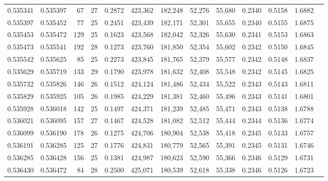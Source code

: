 \begin{tabular}{rrrrrrrrrrrrr}
0.535341 & 0.535397 &  67 &  27 &                                     0.2872 & 423,362 & 182,248 &  52,276 &  55,680 & 0.2340 & 0.5158 & 1.6882 \\
0.535397 & 0.535452 &  77 &  25 &                                     0.2451 & 423,439 & 182,171 &  52,301 &  55,655 & 0.2340 & 0.5155 & 1.6875 \\
0.535453 & 0.535472 & 129 &  25 &                                     0.1623 & 423,568 & 182,042 &  52,326 &  55,630 & 0.2341 & 0.5153 & 1.6863 \\
0.535473 & 0.535541 & 192 &  28 &                                     0.1273 & 423,760 & 181,850 &  52,354 &  55,602 & 0.2342 & 0.5150 & 1.6845 \\
0.535542 & 0.535625 &  85 &  25 &                                     0.2273 & 423,845 & 181,765 &  52,379 &  55,577 & 0.2342 & 0.5148 & 1.6837 \\
0.535629 & 0.535719 & 133 &  29 &                                     0.1790 & 423,978 & 181,632 &  52,408 &  55,548 & 0.2342 & 0.5145 & 1.6825 \\
0.535732 & 0.535826 & 146 &  26 &                                     0.1512 & 424,124 & 181,486 &  52,434 &  55,522 & 0.2343 & 0.5143 & 1.6811 \\
0.535829 & 0.535925 & 105 &  26 &                                     0.1985 & 424,229 & 181,381 &  52,460 &  55,496 & 0.2343 & 0.5141 & 1.6801 \\
0.535928 & 0.536018 & 142 &  25 &                                     0.1497 & 424,371 & 181,239 &  52,485 &  55,471 & 0.2343 & 0.5138 & 1.6788 \\
0.536021 & 0.536095 & 157 &  27 &                                     0.1467 & 424,528 & 181,082 &  52,512 &  55,444 & 0.2344 & 0.5136 & 1.6774 \\
0.536099 & 0.536190 & 178 &  26 &                                     0.1275 & 424,706 & 180,904 &  52,538 &  55,418 & 0.2345 & 0.5133 & 1.6757 \\
0.536191 & 0.536285 & 125 &  27 &                                     0.1776 & 424,831 & 180,779 &  52,565 &  55,391 & 0.2345 & 0.5131 & 1.6746 \\
0.536285 & 0.536428 & 156 &  25 &                                     0.1381 & 424,987 & 180,623 &  52,590 &  55,366 & 0.2346 & 0.5129 & 1.6731 \\
0.536430 & 0.536472 &  84 &  28 &                                     0.2500 & 425,071 & 180,539 &  52,618 &  55,338 & 0.2346 & 0.5126 & 1.6723 \\

\end{tabular}
